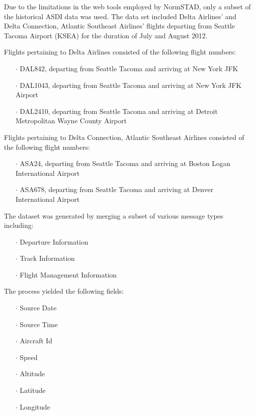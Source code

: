 \documentclass{sig-alternate}
\begin{document}
Due to the limitations in the web tools employed by NormSTAD, only a
subset of the historical ASDI data was used. The data
set included Delta Airlines' and Delta Connection, Atlantic
Southeast Airlines' flights departing from Seattle
Tacoma Airport (KSEA) for the duration of July
and August 2012.

Flights pertaining to Delta Airlines consisted
of the following flight numbers:
\begin{itemize}
\item[$\cdot$] DAL842, departing from Seattle Tacoma
and arriving at New York JFK
\item[$\cdot$]  DAL1043, departing from Seattle Tacoma
and arriving at New York JFK Airport
\item[$\cdot$]  DAL2410, departing from Seattle Tacoma
and arriving at Detroit Metropolitan
Wayne  County Airport
\end{itemize}

Flights pertaining to Delta Connection,
Atlantic Southeast Airlines consisted of the
following flight numbers:
\begin{itemize}
\item[$\cdot$] ASA24, departing from Seattle Tacoma
and arriving at Boston Logan International
Airport
\item[$\cdot$]  ASA678, departing from Seattle Tacoma
and arriving at Denver International
Airport
\end{itemize}

The dataset was generated by merging a subset of
various message types including:
\begin{itemize}
\item[$\cdot$] Departure Information
\item[$\cdot$] Track Information
\item[$\cdot$] Flight Management Information
\end{itemize}

The process yielded the following fields:
\begin{itemize}
\item[$\cdot$] Source Date
\item[$\cdot$] Source Time
\item[$\cdot$] Aircraft Id
\item[$\cdot$] Speed
\item[$\cdot$] Altitude
\item[$\cdot$] Latitude
\item[$\cdot$] Longitude
\end{itemize}
\end{document}
